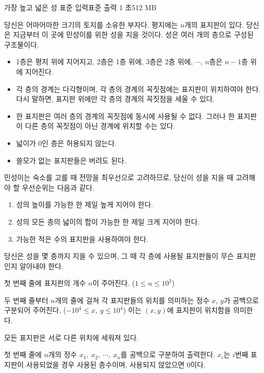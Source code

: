 \begin{problem}{가장 높고 넓은 성}
    {표준 입력}{표준 출력}
    {1 초}{512 MB}{}
    
    
    
    당신은 어마어마한 크기의 토지를 소유한 부자다. 평지에는 $ n $개의 표지판이 있다. 당신은 지금부터 이 곳에 민성이를 위한 성을 지을 것이다. 성은 여러 개의 층으로 구성된 구조물이다.
    
    \begin{itemize}
        \item 1층은 평지 위에 지어지고, 2층은 1층 위에, 3층은 2층 위에, $ \cdots $, $ n $층은 $ n-1 $층 위에 지어진다.
        \item 각 층의 경계는 다각형이며, 각 층의 경계의 꼭짓점에는 표지판이 위치하여야 한다. 다시 말하면, 표지판 위에만 각 층의 경계의 꼭짓점을 세울 수 있다.
        \item 한 표지판은 여러 층의 경계의 꼭짓점에 동시에 사용될 수 없다. 그러나 한 표지판이 다른 층의 꼭짓점이 아닌 경계에 위치할 수는 있다.
        \item 넓이가 0인 층은 허용되지 않는다.
        \item 쓸모가 없는 표지판들은 버려도 된다.
    \end{itemize}
    민성이는 숙소를 고를 때 전망을 최우선으로 고려하므로, 당신이 성을 지을 때 고려해야 할 우선순위는 다음과 같다.
    
    \begin{enumerate}
        \item 성의 높이를 가능한 한 제일 높게 지어야 한다.
        \item 성의 모든 층의 넓이의 합이 가능한 한 제일 크게 지어야 한다.
        \item 가능한 적은 수의 표지판을 사용하여야 한다.
    \end{enumerate}
    당신은 성을 몇 층까지 지을 수 있으며, 그 때 각 층에 사용될 표지판들이 무슨 표지판인지 알아내야 한다.
    
    
    \InputFile
    첫 번째 줄에 표지판의 개수 $ n $이 주어진다. ($ 1 \leq n \leq 10^3 $) 
    
    두 번째 줄부터 $ n $개의 줄에 걸쳐 각 표지판들의 위치를 의미하는 정수 $ x $, $ y $가 공백으로 구분되어 주어진다. ($ -10^4 \leq x,\ y \leq 10^4 $) 이는 $ (x, y) $에 표지판이 위치함을 의미한다.
    
    모든 표지판은 서로 다른 위치에 세워져 있다.
    
    
    \OutputFile
    첫 번째 줄에 $ n $개의 정수 $ x_1,\ x_2,\ \cdots,\ x_n $를 공백으로 구분하여 출력한다. $ x_i $는 $ i $번째 표지판이 사용되었을 경우 사용된 층수이며, 사용되지 않았으면 0이다.


\end{problem}
